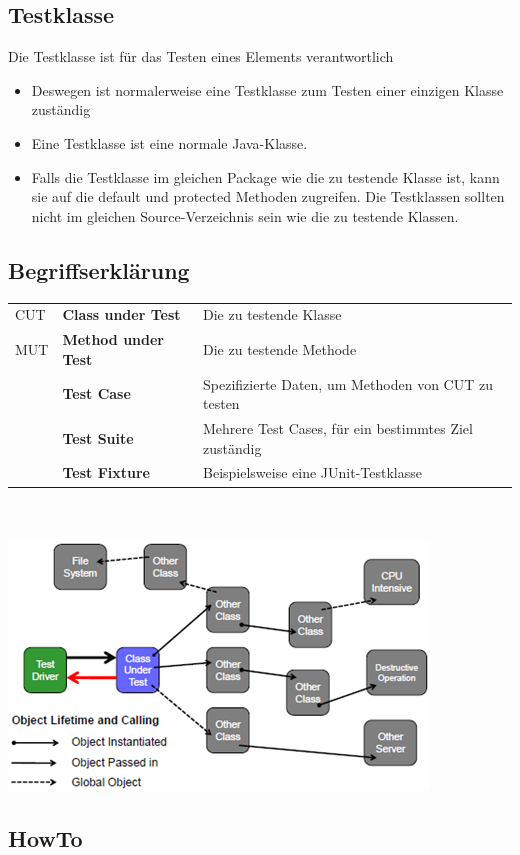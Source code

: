 \documentclass[a4paper,10pt]{article}
\newcommand{\Bold}[1]{\textbf{#1}} %
\begin{document}
\subsection{Testklasse}
Die Testklasse ist für das Testen eines Elements verantwortlich
\begin{itemize}
	\item Deswegen ist normalerweise eine Testklasse zum Testen einer einzigen Klasse zuständig
	\item Eine Testklasse ist eine normale Java-Klasse.
	\item Falls die Testklasse im gleichen Package wie die zu testende Klasse ist, kann sie auf die default und protected Methoden zugreifen. Die Testklassen sollten nicht im gleichen Source-Verzeichnis sein wie die zu testende Klassen.
\end{itemize}

\subsection{Begriffserklärung}
\begin{tabular}{lll}
CUT&\Bold {Class under Test}&Die zu testende Klasse\\
MUT&\Bold {Method under Test}&Die zu testende Methode\\
&\Bold {Test Case}&Spezifizierte Daten, um Methoden von CUT zu testen\\
&\Bold {Test Suite}&Mehrere Test Cases, für ein bestimmtes Ziel zuständig\\
&\Bold {Test Fixture}&Beispielsweise eine JUnit-Testklasse\\
\end{tabular}\\ \\
\includegraphics[scale=1]{Begriffe.png}

\subsection{HowTo}
\end{document}
